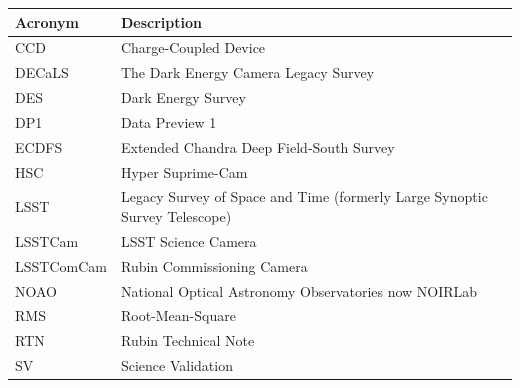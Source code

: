 \addtocounter{table}{-1}
\begin{longtable}{p{}p{}}\hline
\textbf{Acronym} & \textbf{Description}  \\\hline

CCD & Charge-Coupled Device \\\hline
DECaLS & The Dark Energy Camera Legacy Survey \\\hline
DES & Dark Energy Survey \\\hline
DP1 & Data Preview 1 \\\hline
ECDFS & Extended Chandra Deep Field-South Survey \\\hline
HSC & Hyper Suprime-Cam \\\hline
LSST & Legacy Survey of Space and Time (formerly Large Synoptic Survey Telescope) \\\hline
LSSTCam & LSST Science Camera \\\hline
LSSTComCam & Rubin Commissioning Camera \\\hline
NOAO & National Optical Astronomy Observatories now NOIRLab \\\hline
RMS & Root-Mean-Square \\\hline
RTN & Rubin Technical Note \\\hline
SV & Science Validation \\\hline
\end{longtable}
